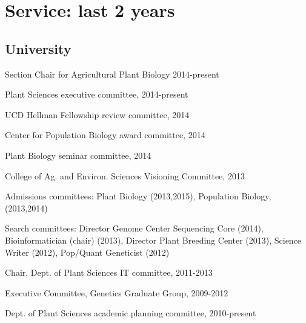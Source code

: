 \documentclass[letterpaper]{article}
\renewenvironment{itemize}{
  \begin{list}{}{
    \setlength{\leftmargin}{1.5em}
  }
}{
  \end{list}
}
\begin{document}
\section*{Service: last 2 years}
\begin{itemize}
\subsection*{University}
\item Section Chair for Agricultural Plant Biology 2014-present
\item Plant Sciences executive committee, 2014-present
\item UCD Hellman Fellowship review committee, 2014
\item Center for Population Biology award committee, 2014
\item Plant Biology seminar committee, 2014
\item College of Ag. and Environ. Sciences Visioning Committee, 2013
\item Admissions committees: Plant Biology (2013,2015), Population Biology, (2013,2014)
\item Search committees: Director Genome Center Sequencing Core (2014), Bioinformatician (chair) (2013), Director Plant Breeding Center (2013), Science Writer (2012), Pop/Quant Geneticist (2012)
\item Chair, Dept. of Plant Sciences IT committee, 2011-2013
\item Executive Committee, Genetics Graduate Group, 2009-2012
\item Dept. of Plant Sciences academic planning committee, 2010-present


\end{itemize}
\end{document}
